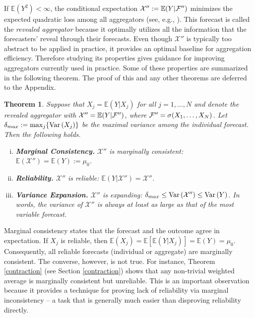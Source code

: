 \documentclass[11pt]{article}
\newcommand{\E}{\mathbb{E}}
\newtheorem{theorem}{Theorem}[section]
\theoremstyle{definition}
\theoremstyle{definition}
\def\F{{\cal F}}
\def\E{{\mathbb E}}
\def\Var{{\rm Var}\,}
\begin{document}
If $\E\left(Y^2\right) < \infty$, the conditional expectation
$\mathcal{X}'' := \E(Y | \F'')$ minimizes the expected quadratic loss
among all aggregators (see, e.g., \citealt{durrett2010probability}). This forecast is called the \textit{revealed
aggregator} because it optimally utilizes all the information that the
forecasters' reveal through their forecasts. Even though
$\mathcal{X}'' $ is typically too abstract to be applied in practice,
it provides an optimal baseline for aggregation
efficiency. Therefore studying its properties gives guidance for
improving aggregators currently used in practice. Some of these
properties are summarized in the following theorem. The proof of this
and any other theorems are deferred to the Appendix.



\begin{theorem} \label{optimal}
Suppose that $X_j = \E(Y | X_j)$ for all $j = 1, \dots, N$ and denote the revealed aggregator with $\mathcal{X}'' = \E(Y | \F'')$, where $\F'' = \sigma(X_1, \dots, X_N)$. 
Let $\delta_{max} := \max_j \{ \Var(X_j)  \}$ be the maximal variance among the individual forecast.
 Then the following holds.
\begin{enumerate}[i)] \label{properties}
\item \textbf{Marginal Consistency.} $\mathcal{X}''$ is marginally consistent:  $\E(\mathcal{X}'') = \E(Y) :=  \mu_0$.
\item \textbf{Reliability.} $\mathcal{X}''$ is reliable: $\E(Y|\mathcal{X}'') = \mathcal{X}''$. 
\item \textbf{Variance Expansion.} $\mathcal{X}''$ is expanding: $\delta_{max} \leq \Var(\mathcal{X}'') \leq \Var(Y)$. In words, the variance of $\mathcal{X}''$ is always at least as large as that of the most variable forecast. 
\end{enumerate}
\end{theorem}
Marginal consistency states that the forecast and the outcome agree in expectation. If $X_j$ is reliable, then $\E(X_j) = \E[\E(Y|X_j)] = \E(Y) = \mu_0$. Consequently, all reliable forecasts (individual or aggregate) are marginally consistent. The converse, however, is not true. For instance, Theorem \ref{contraction} (see Section \ref{contraction})  shows that any non-trivial weighted average is marginally consistent but unreliable. This is an important observation because it provides a technique for proving lack of reliability via marginal inconsistency -- a task that is generally much easier than disproving reliability directly.
\end{document}
